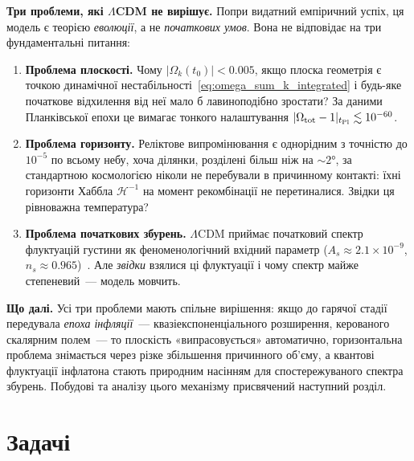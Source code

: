 \medskip
\textbf{Три проблеми, які $\Lambda$CDM не вирішує.}
Попри видатний емпіричний успіх, ця модель є теорією \emph{еволюції},
а не \emph{початкових умов}.
Вона не відповідає на три фундаментальні питання:

\begin{enumerate}
  \item \textbf{Проблема плоскості.}
  Чому $|\Omega_k(t_0)| < 0.005$, якщо плоска геометрія є точкою
  динамічної нестабільності~\eqref{eq:omega_sum_k_integrated} і будь-яке
  початкове відхилення від неї мало б лавиноподібно зростати?
  За даними Планківської епохи це вимагає тонкого налаштування
  $|\Omega_{\rm tot} - 1|_{t_{\rm Pl}} \lesssim 10^{-60}$.

  \item \textbf{Проблема горизонту.}
  Реліктове випромінювання є однорідним з точністю до $10^{-5}$ по всьому
  небу, хоча ділянки, розділені більш ніж на ${\sim}2°$, за стандартною
  космологією ніколи не перебували в причинному контакті: їхні горизонти
  Хаббла $\mathcal{H}^{-1}$ на момент рекомбінації не перетиналися.
  Звідки ця рівноважна температура?

  \item \textbf{Проблема початкових збурень.}
  $\Lambda$CDM приймає початковий спектр флуктуацій густини як
  феноменологічний вхідний параметр ($A_s \approx 2.1\times10^{-9}$,
  $n_s \approx 0.965$)~\cite{planck_2018}. Але \emph{звідки} взялися ці
  флуктуації і чому спектр майже степеневий~--- модель мовчить.
\end{enumerate}

\medskip
\textbf{Що далі.}
Усі три проблеми мають спільне вирішення: якщо до гарячої стадії
передувала \emph{епоха інфляції}~--- квазіекспоненціального розширення,
керованого скалярним полем~--- то плоскість «випрасовується» автоматично,
горизонтальна проблема знімається через різке збільшення причинного об'єму,
а квантові флуктуації інфлатона стають природним насінням для спостережуваного
спектра збурень.
Побудові та аналізу цього механізму присвячений наступний розділ.



\section*{Задачі}

